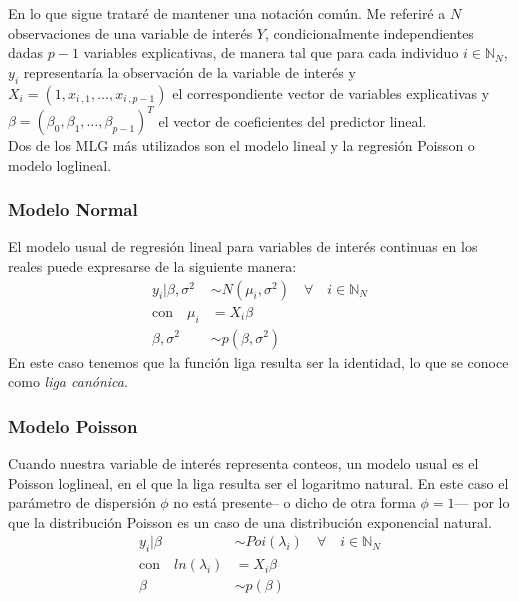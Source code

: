 En lo que sigue {\color{Aquamarine} trataré de mantener} una notación común. Me referiré a $N$ observaciones de una variable de interés $Y$, condicionalmente independientes dadas $p-1$ variables explicativas, de manera tal que para cada individuo $i\in \mathbb{N}_N$, $y_i$ representaría la observación de la variable de interés y $X_i = (1, x_{i\,,1}, \dots ,x_{i\,,p-1})$ el correspondiente vector de variables explicativas y $\beta=(\beta_0, \beta_1, \dots, \beta_{p-1})^T$ el vector de coeficientes del predictor lineal.\\

Dos de los MLG más utilizados son el modelo lineal y la regresión Poisson o modelo loglineal.  

\subsubsection*{Modelo Normal}

El modelo usual de regresión lineal para variables de interés continuas en los reales puede expresarse de la siguiente manera: 
\begin{align} \label{eq:MLG_Normal}
y_i|\beta,\sigma^2 & \sim N(\mu_i,\sigma^2) \quad \forall \quad i \in \mathbb{N}_N \nonumber \\
\text{con} \quad \mu_i &= X_i\beta \nonumber \\
\beta,\sigma^2 &\sim p(\beta,\sigma^2)
\end{align}
En este caso tenemos que la función liga resulta ser la identidad, lo que se conoce como \textit{liga canónica}. 

\subsubsection*{Modelo Poisson}

Cuando nuestra variable de interés representa conteos, un modelo usual es el Poisson loglineal, en el que la liga resulta ser el logaritmo natural. En este caso el parámetro de dispersión $\phi$ no está presente-- o dicho de otra forma $\phi=1$--- por lo que la distribución Poisson es un caso de una distribución exponencial natural. 
\begin{align} \label{eq:MLG_Poi}
y_i|\beta & \sim Poi(\lambda_i) \quad \forall \quad i \in \mathbb{N}_N \nonumber \\
\text{con} \quad ln(\lambda_i) &= X_i\beta \nonumber \\
\beta &\sim p(\beta)
\end{align}

